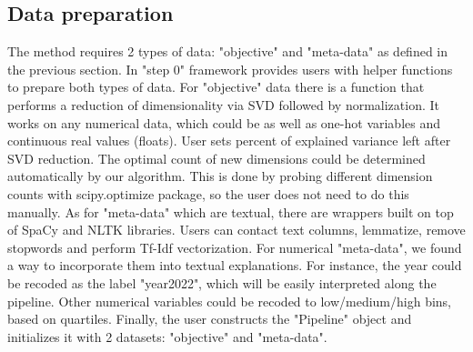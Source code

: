 \documentclass[
 twocolumn,
]{ceurart}
\begin{document}
\subsection{Data preparation}
The method requires 2 types of data: "objective" and "meta-data" as defined in the previous section.
In "step 0" framework provides users with helper functions to prepare both types of data.
For "objective" data there is a function that performs a reduction of dimensionality via SVD followed by normalization.
It works on any numerical data, which could be as well as one-hot variables and continuous real values (floats).
User sets percent of explained variance left after SVD reduction.
The optimal count of new dimensions could be determined automatically by our algorithm.
This is done by probing different dimension counts with scipy.optimize package, so the user does not need to do this manually.
As for "meta-data" which are textual, there are wrappers built on top of SpaCy and NLTK libraries.
Users can contact text columns, lemmatize, remove stopwords and perform Tf-Idf vectorization.
For numerical "meta-data", we found a way to incorporate them into textual explanations.
For instance, the year could be recoded as the label "year2022", which will be easily interpreted along the pipeline.
Other numerical variables could be recoded to low/medium/high bins, based on quartiles.
Finally, the user constructs the "Pipeline" object and initializes it with 2 datasets: "objective" and "meta-data".
\end{document}
